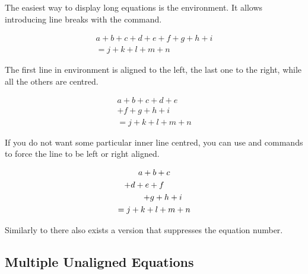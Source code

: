 The easiest way to display long equations is the  environment. It
allows introducing line breaks with the \csi{\bs} command.
\begin{example}
\begin{multline}
  a + b + c + d + e
  + f + g + h + i \\
  = j + k + l + m + n
\end{multline}
\end{example}
The first line in  environment is aligned to the left, the last
one to the right, while all the others are centred.
\begin{example}
\begin{multline}
  a + b + c + d + e \\
  + f + g + h + i \\
  = j + k + l + m + n
\end{multline}
\end{example}

If you do not want some particular inner line centred, you can use
 and  commands to force the line to be left or
right aligned.
\begin{example}
\begin{multline}
  a + b + c \\
  \shoveleft{+ d + e + f} \\
  \shoveright{+ g + h + i} \\
  = j + k + l + m + n
\end{multline}
\end{example}

Similarly to  there also exists a  version that
suppresses the equation number.

\subsection{Multiple Unaligned Equations}

